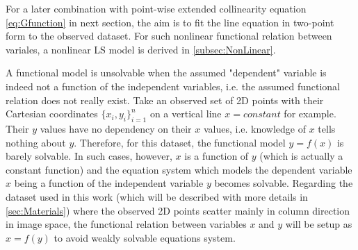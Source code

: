 For a later combination with point-wise extended collinearity equation \eqref{eq:Gfunction} in next section, the aim is to fit the line equation in two-point form to the observed dataset. 
For such nonlinear functional relation between variales, a nonlinear LS model is derived in \cref{subsec:NonLinear}.

A functional model is unsolvable when the assumed "dependent" variable is indeed not a function of the independent variables, i.e. the assumed functional relation does not really exist. Take an observed set of 2D points with their Cartesian coordinates $\{x_i,y_i\}^n_{i=1}$ on a vertical line $x=constant$ for example. Their $y$ values have no dependency on their $x$ values, i.e. knowledge of $x$ tells nothing about $y$. Therefore, for this dataset, the functional model $y=f(x)$ is barely solvable. In such cases, however, $x$ is a function of $y$ (which is actually a constant function) and the equation system which models the dependent variable $x$ being a function of the independent variable $y$ becomes solvable. Regarding the dataset used in this work (which will be described with more details in \cref{sec:Materials}) where the observed 2D points scatter mainly in column direction in image space, the functional relation between variables $x$ and $y$ will be setup as $x=f(y)$ to avoid weakly solvable equations system.






